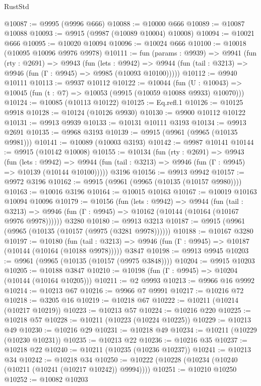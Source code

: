 \begin{lexlean}{RustStd}
\begin{coremodule}
{\begin{coremodule}
{{{{{{{{{{{{{{{{{{{{{{{{{@10087 := @9995 (@9996 @666)
@10088 := @10000 @666
@10089 := @10087 @10088
@10093 := @9915 (@9987 (@10089 @10004) @10008)
@10094 := @10021 @666
@10095 := @10020 @10094
@10096 := @10024 @666
@10100 := @10018 (@10095 @10096 @9976 @9978)
@10111 := fun (params : @9939) =>
  @9941
    (fun (rty : @2691) =>
    @9943
      (fun (lets : @9942) =>
      @9944 (fun (tail : @3213) => @9946 (fun (Γ : @9945) => @9985 (@10093 @10100)))))
@10112 := @9940 @10111
@10113 := @9937 @10112
@10122 := @10044
    (fun (U : @10043) => @10045 (fun (t : @7) => @10053 (@9915 (@10059 @10088 @9933) @10070)))
@10124 := @10085 (@10113 @10122)
@10125 := Eq.refl.{1}
@10126 := @10125 @9918
@10128 := @10124 (@10126 @9930)
@10130 := @9900 @10112 @10122
@10131 := @9913 @9939
@10133 := @10131 @10111 @3193
@10134 := @9913 @2691
@10135 := @9968 @3193
@10139 := @9915 (@9961 (@9965 (@10135 @9981)))
@10141 := @10089 (@10003 @3193)
@10142 := @9987 @10141
@10144 := @9915 (@10142 @10008)
@10155 := @10134
    (fun (rty : @2691) =>
    @9943
      (fun (lets : @9942) =>
      @9944 (fun (tail : @3213) => @9946 (fun (Γ : @9945) => @10139 (@10144 @10100)))))
    @3196
@10156 := @9913 @9942
@10157 := @9972 @3196
@10162 := @9915 (@9961 (@9965 (@10135 (@10157 @9980))))
@10163 := @10016 @3196
@10164 := @10015 @10163
@10167 := @10019 @10163 @10094 @10096
@10179 := @10156
    (fun (lets : @9942) =>
    @9944
      (fun (tail : @3213) =>
      @9946 (fun (Γ : @9945) => @10162 (@10144 (@10164 (@10167 @9976 @9978))))))
    @3280
@10180 := @9913 @3213
@10187 := @9915 (@9961 (@9965 (@10135 (@10157 (@9975 (@3281 @9978))))))
@10188 := @10167 @3280
@10197 := @10180
    (fun (tail : @3213) => @9946 (fun (Γ : @9945) => @10187 (@10144 (@10164 (@10188 @9978)))))
    @3847
@10198 := @9913 @9945
@10203 := @9961 (@9965 (@10135 (@10157 (@9975 @3848))))
@10204 := @9915 @10203
@10205 := @10188 @3847
@10210 := @10198 (fun (Γ : @9945) => @10204 (@10144 (@10164 @10205)))
@10211 := @2 @9993
@10213 := @9966 @16 @9992
@10214 := @10213 @67
@10216 := @9966 @7 @9991
@10217 := @10216 @72
@10218 := @3205 @16
@10219 := @10218 @67
@10222 := @10211 (@10214 (@10217 @10219))
@10223 := @10213 @57
@10224 := @10216 @220
@10225 := @10218 @57
@10228 := @10211 (@10223 (@10224 @10225))
@10229 := @10213 @49
@10230 := @10216 @29
@10231 := @10218 @49
@10234 := @10211 (@10229 (@10230 @10231))
@10235 := @10213 @22
@10236 := @10216 @35
@10237 := @10218 @22
@10240 := @10211 (@10235 (@10236 @10237))
@10241 := @10213 @34
@10242 := @10218 @34
@10250 := @10222 (@10228 (@10234 (@10240 (@10211 (@10241 (@10217 @10242)) @9994))))
@10251 := @10210 @10250
@10252 := @10082 @10203
}}}}}}}}}}}}}}}}}}}}}}}}}
\end{coremodule}}
\end{coremodule}
\end{lexlean}
